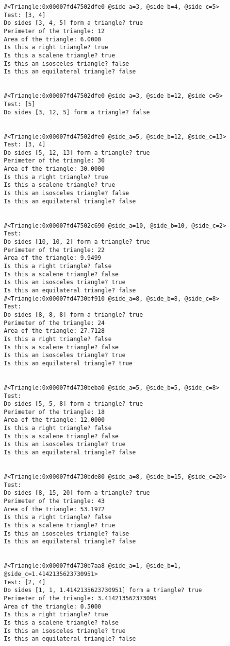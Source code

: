 \documentclass{article}
\begin{document}
\begin{verbatim} 
#<Triangle:0x00007fd47502dfe0 @side_a=3, @side_b=4, @side_c=5>
Test: [3, 4]
Do sides [3, 4, 5] form a triangle? true
Perimeter of the triangle: 12
Area of the triangle: 6.0000
Is this a right triangle? true
Is this a scalene triangle? true
Is this an isosceles triangle? false
Is this an equilateral triangle? false


#<Triangle:0x00007fd47502dfe0 @side_a=3, @side_b=12, @side_c=5>
Test: [5]
Do sides [3, 12, 5] form a triangle? false


#<Triangle:0x00007fd47502dfe0 @side_a=5, @side_b=12, @side_c=13>
Test: [3, 4]
Do sides [5, 12, 13] form a triangle? true
Perimeter of the triangle: 30
Area of the triangle: 30.0000
Is this a right triangle? true
Is this a scalene triangle? true
Is this an isosceles triangle? false
Is this an equilateral triangle? false


#<Triangle:0x00007fd47502c690 @side_a=10, @side_b=10, @side_c=2>
Test: 
Do sides [10, 10, 2] form a triangle? true
Perimeter of the triangle: 22
Area of the triangle: 9.9499
Is this a right triangle? false
Is this a scalene triangle? false
Is this an isosceles triangle? true
Is this an equilateral triangle? false
#<Triangle:0x00007fd4730bf910 @side_a=8, @side_b=8, @side_c=8>
Test: 
Do sides [8, 8, 8] form a triangle? true
Perimeter of the triangle: 24
Area of the triangle: 27.7128
Is this a right triangle? false
Is this a scalene triangle? false
Is this an isosceles triangle? true
Is this an equilateral triangle? true


#<Triangle:0x00007fd4730beba0 @side_a=5, @side_b=5, @side_c=8>
Test: 
Do sides [5, 5, 8] form a triangle? true
Perimeter of the triangle: 18
Area of the triangle: 12.0000
Is this a right triangle? false
Is this a scalene triangle? false
Is this an isosceles triangle? true
Is this an equilateral triangle? false


#<Triangle:0x00007fd4730bde80 @side_a=8, @side_b=15, @side_c=20>
Test: 
Do sides [8, 15, 20] form a triangle? true
Perimeter of the triangle: 43
Area of the triangle: 53.1972
Is this a right triangle? false
Is this a scalene triangle? true
Is this an isosceles triangle? false
Is this an equilateral triangle? false


#<Triangle:0x00007fd4730b7aa8 @side_a=1, @side_b=1, @side_c=1.4142135623730951>
Test: [2, 4]
Do sides [1, 1, 1.4142135623730951] form a triangle? true
Perimeter of the triangle: 3.414213562373095
Area of the triangle: 0.5000
Is this a right triangle? true
Is this a scalene triangle? false
Is this an isosceles triangle? true
Is this an equilateral triangle? false
\end{verbatim}
\end{document}

